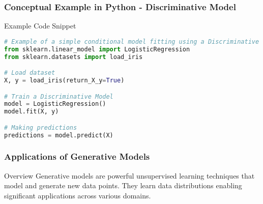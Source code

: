\documentclass[aspectratio=169]{beamer}
\begin{document}
\begin{frame}[fragile]
  \frametitle{Conceptual Example in Python - Discriminative Model}
  
  \begin{block}{Example Code Snippet}
    \begin{lstlisting}[language=Python]
# Example of a simple conditional model fitting using a Discriminative approach
from sklearn.linear_model import LogisticRegression
from sklearn.datasets import load_iris

# Load dataset
X, y = load_iris(return_X_y=True)

# Train a Discriminative Model
model = LogisticRegression()
model.fit(X, y)

# Making predictions
predictions = model.predict(X)
    \end{lstlisting}
  \end{block}
\end{frame}

\begin{frame}[fragile]
    \frametitle{Applications of Generative Models}
    \begin{block}{Overview}
        Generative models are powerful unsupervised learning techniques that model and generate new data points. They learn data distributions enabling significant applications across various domains.
    \end{block}
\end{frame}
\end{document}

